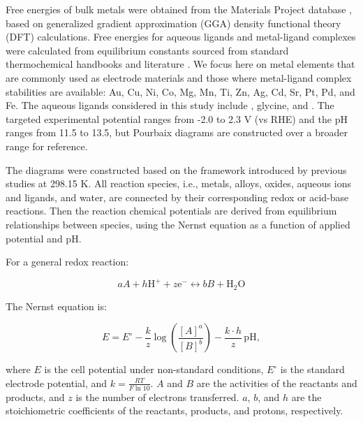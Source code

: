 \documentclass[journal=jacsat,manuscript=article]{achemso}
\begin{document}
Free energies of bulk metals were obtained from the Materials Project database \cite{Jain2013TheInnovation}, based on generalized gradient approximation (GGA) density functional theory (DFT) calculations. Free energies for aqueous ligands and metal-ligand complexes were calculated from equilibrium constants sourced from standard thermochemical handbooks \cite{Wagman1982TheUnits, Smith1989CriticalConstants, Bard2017StandardSolution, Bjerrum1957StabilitySubstances} and literature \cite{Meng1996PrinciplesReview, Azadi2019DataComplexes, Aviles2022ExploringNH3, Oraby2023SelectiveSolutions, Harrington2005DeterminationIon}. We focus here on metal elements that are commonly used as electrode materials and those where metal-ligand complex stabilities are available: Au, Cu, Ni, Co, Mg, Mn, Ti, Zn, Ag, Cd, Sr, Pt, Pd, and Fe. The aqueous ligands considered in this study include , glycine, and . The targeted experimental potential ranges from -2.0 to 2.3 V (vs RHE) and the pH ranges from 11.5 to 13.5, but Pourbaix diagrams are constructed over a broader range for reference.


The diagrams were constructed based on the framework introduced by previous studies \cite{PourbaixAtlasSolutions, Huang2017ImprovedCompounds,Huang2015ElectrochemicalCalculations,Singh2017ElectrochemicalMaterials,Patel2019EfficientCompounds,Persson2012PredictionStates, Ding2018ElectrochemicalStates, Thompson2011PourbaixSystems} at 298.15 K. All reaction species, i.e., metals, alloys, oxides, aqueous ions and ligands, and water, are connected by their corresponding redox or acid-base reactions. Then the reaction chemical potentials are derived from equilibrium relationships between species, using the Nernst equation as a function of applied potential and pH.

For a general redox reaction:

\begin{equation} \label{eq:reaction}
aA + h\text{H}^+ + z\text{e}^- \leftrightarrow bB + \text{H}_2\text{O}
\end{equation}

The Nernst equation is:

\begin{equation} \label{eq:nernst}
E = E^\circ - \frac{k}{z} \log \left(\frac{[A]^a}{[B]^b}\right) - \frac{k \cdot h}{z} \, \text{pH},
\end{equation}

where \( E \) is the cell potential under non-standard conditions, \( E^\circ \) is the standard electrode potential, and \( k = \frac{RT}{F \ln 10} \). \( A \) and \( B \) are the activities of the reactants and products, and \( z \) is the number of electrons transferred. \( a \), \( b \), and \( h \) are the stoichiometric coefficients of the reactants, products, and protons, respectively.
\end{document}
